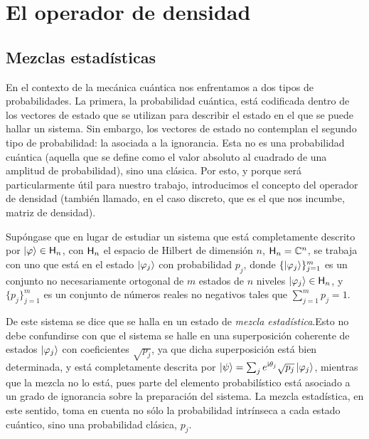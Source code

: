 \section{El operador de densidad}

\subsection{Mezclas estadísticas}


En el contexto de la mecánica cuántica nos enfrentamos a dos tipos de probabilidades. La primera, la probabilidad cuántica, está codificada dentro de los vectores de estado que se utilizan para describir el estado en el que se puede hallar un sistema. Sin embargo, los vectores de estado no contemplan el segundo tipo de probabilidad: la asociada a la ignorancia. Esta no es una probabilidad cuántica (aquella que se define como el valor absoluto al cuadrado de una amplitud de probabilidad), sino una clásica. Por esto, y porque será particularmente útil para nuestro trabajo, introducimos el concepto del operador de densidad (también llamado, en el caso discreto, que es el que nos incumbe, matriz de densidad).


Supóngase que en lugar de estudiar un sistema que está completamente descrito por $\ket{\varphi}\in{\sf H}_{n}$, con ${\sf H}_{n}$ el espacio de Hilbert de dimensión $n$, \ie{} ${\sf H}_{n}=\mathbb{C}^{n}$, se trabaja con uno que está en el estado $\ket{\varphi_{j}}$ con probabilidad $p_{j}$, donde $\{\ket{\varphi_{j}}\}_{j=1}^{m}$ es un conjunto no necesariamente ortogonal de $m$ estados de $n$ niveles $\ket{\varphi_{j}}\in{\sf H}_{n}$, y $\{p_{j}\}_{j=1}^{m}$ es un conjunto de números reales no negativos tales que $\sum_{j=1}^{m} p_{j}=1$.

De este sistema se dice que se halla en un estado de \textit{mezcla estadística}.Esto no debe confundirse con que el sistema se halle en una superposición coherente de estados $\ket{\varphi_{j}}$ con coeficientes $\sqrt{p_{j}}$, ya que dicha superposición está bien determinada, y está completamente descrita por $\ket{\psi}=\sum_{j} e^{\text{i} \theta_j} \sqrt{p_{j}}\ket{\varphi_{j}}$, mientras que la mezcla no lo está, pues parte del elemento probabilístico está asociado a un grado de ignorancia sobre la preparación del sistema. La mezcla estadística, en este sentido, toma en cuenta no sólo la probabilidad intrínseca a cada estado cuántico, sino una probabilidad clásica, $p_{j}$. 

